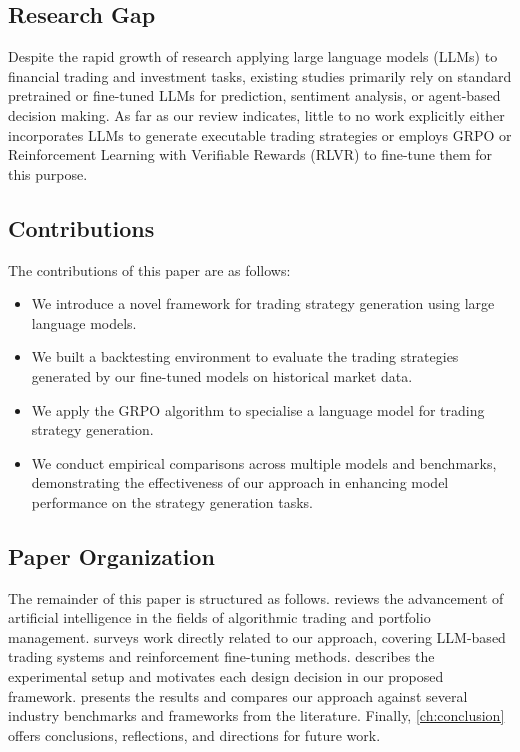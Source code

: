\documentclass[conference]{IEEEtran}
\begin{document}
\subsection{Research Gap}
\label{sec:gap}

Despite the rapid growth of research applying large language models (LLMs) to financial trading
and investment tasks, existing studies primarily rely on standard pretrained or fine-tuned LLMs
for prediction, sentiment analysis, or agent-based decision making. As far as our review
indicates, little to no work explicitly either incorporates LLMs to generate executable trading strategies or employs GRPO or Reinforcement Learning with Verifiable Rewards (RLVR) to fine-tune them for this purpose.

\subsection{Contributions}
\label{sec:contributions}

The contributions of this paper are as follows:

\begin{itemize}
  \item We introduce a novel framework for trading strategy generation using large language models.
  \item We built a backtesting environment to evaluate the trading strategies generated by our fine-tuned models on historical
        market data.
  \item We apply the GRPO algorithm to specialise a language
        model for trading strategy generation.
  \item We conduct empirical comparisons across multiple models and benchmarks, demonstrating the effectiveness of our approach in enhancing model performance on the strategy generation tasks.
\end{itemize}

\subsection{Paper Organization}
\label{sec:outline}

The remainder of this paper is structured as follows.
 reviews the advancement of artificial intelligence in the fields of
algorithmic trading and portfolio management.
 surveys work directly related to our approach, covering LLM-based trading
systems and reinforcement fine-tuning methods.
 describes the experimental setup and motivates each design decision in our
proposed framework.
 presents the results and compares our approach against several industry
benchmarks and frameworks from the literature.
Finally, \cref{ch:conclusion} offers conclusions, reflections, and directions for future work.
\end{document}
